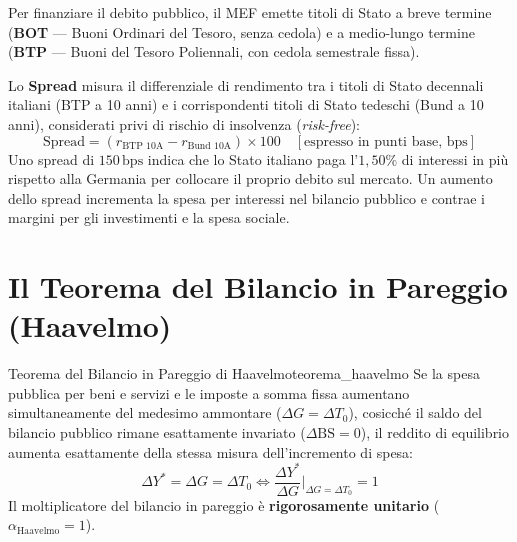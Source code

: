 \begin{empirico}
Per finanziare il debito pubblico, il MEF emette titoli di Stato a breve termine (\textbf{BOT} — Buoni Ordinari del Tesoro, senza cedola) e a medio-lungo termine (\textbf{BTP} — Buoni del Tesoro Poliennali, con cedola semestrale fissa).

Lo \textbf{Spread} misura il differenziale di rendimento tra i titoli di Stato decennali italiani (BTP a 10 anni) e i corrispondenti titoli di Stato tedeschi (Bund a 10 anni), considerati privi di rischio di insolvenza (\textit{risk-free}):
\begin{equation}
    \text{Spread} = (r_{\text{BTP 10A}} - r_{\text{Bund 10A}}) \times 100 \quad [\text{espresso in punti base, bps}]
\end{equation}
Uno spread di $150\,\text{bps}$ indica che lo Stato italiano paga l'$1{,}50\%$ di interessi in più rispetto alla Germania per collocare il proprio debito sul mercato. Un aumento dello spread incrementa la spesa per interessi nel bilancio pubblico e contrae i margini per gli investimenti e la spesa sociale.
\end{empirico}

\section{Il Teorema del Bilancio in Pareggio (Haavelmo)}

\begin{teorema}{Teorema del Bilancio in Pareggio di Haavelmo}{teorema_haavelmo}
Se la spesa pubblica per beni e servizi e le imposte a somma fissa aumentano simultaneamente del medesimo ammontare ($\Delta G = \Delta T_0$), cosicché il saldo del bilancio pubblico rimane esattamente invariato ($\Delta \mathrm{BS} = 0$), il reddito di equilibrio aumenta esattamente della stessa misura dell'incremento di spesa:
\begin{equation}
    \Delta Y^* = \Delta G = \Delta T_0 \iff \frac{\Delta Y^*}{\Delta G}\bigg|_{\Delta G = \Delta T_0} = 1
\end{equation}
Il moltiplicatore del bilancio in pareggio è \textbf{rigorosamente unitario} ($\alpha_{\text{Haavelmo}} = 1$).
\end{teorema}

